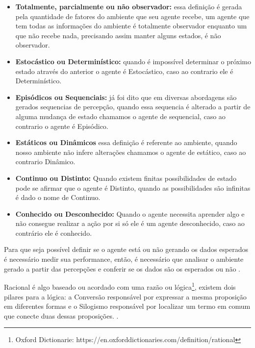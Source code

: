 \begin{itemize}
 \item \textbf{Totalmente, parcialmente ou não observador:} essa definição é gerada pela quantidade de fatores do ambiente que seu agente recebe, um agente que tem todas as informações do ambiente é totalmente observador enquanto um que não recebe nada, precisando assim manter alguns estados, é não observador.
 \item \textbf{Estocástico ou Determinístico:} quando é impossível determinar o próximo estado através do anterior o agente é Estocástico, caso ao contrario ele é Determinístico.
 \item \textbf{Episódicos ou Sequenciais:} já foi dito que em diversas abordagens são gerados sequencias de percepção, quando essa sequencia é alterado a partir de alguma mudança de estado chamamos o agente de sequencial, caso ao contrario o agente é Episódico.
 \item \textbf{Estáticos ou Dinâmicos} essa definição é referente ao ambiente, quando nosso ambiente não infere alterações chamamos o agente de estático, caso ao contrario Dinâmico.
 \item \textbf{Continuo ou Distinto:} Quando existem finitas possibilidades de estado pode se afirmar que o agente é Distinto, quando as possibilidades são infinitas é dado o nome de Continuo.
 \item \textbf{Conhecido ou Desconhecido:} Quando o agente necessita aprender algo e não consegue realizar a ação por si só ele é um agente desconhecido, caso ao contrário ele é conhecido.
\end{itemize}

Para que seja possível definir se o agente está ou não gerando os dados esperados é necessário medir sua performance, então, é necessário que analisar o ambiente gerado a partir das percepções e conferir se os dados são os esperados ou não \cite[294-295]{frege1956thought}.

Racional é algo baseado ou acordado com uma razão ou lógica\footnote{Oxford Dictionarie:  https://en.oxforddictionaries.com/definition/rational}, existem dois pilares para a lógica: a Conversão responsável por expressar a mesma proposição em diferentes formas e o Silogismo responsável por localizar um termo em comum que conecte duas dessas proposições. \cite[175]{boole1854investigation}.